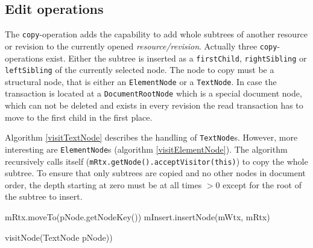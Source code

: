 \subsection{Edit operations}\label{subsec::operations}
The \texttt{copy}-operation adds the capability to add whole subtrees of another resource or revision to the currently opened \emph{resource/revision}. Actually three \texttt{copy}-operations exist. Either the subtree is inserted as a \texttt{first\-Child}, \texttt{rightSibling} or \texttt{leftSibling} of the currently selected node. The node to copy must be a structural node, that is either an \texttt{ElementNode} or a \texttt{TextNode}. In case the transaction is located at a \texttt{DocumentRootNode} which is a special document node, which can not be deleted and exists in every revision the read transaction has to move to the first child in the first place.

Algorithm \ref{visitTextNode} describes the handling of \texttt{TextNode}s. However, more interesting are \texttt{ElementNode}s (algorithm \ref{visitElementNode}). The algorithm recursively calls itself (\texttt{mRtx.getNode().acceptVisitor(this)}) to copy the whole subtree. To ensure that only subtrees are copied and no other nodes in document order, the depth starting at zero must be at all times $>0$ except for the root of the subtree to insert.

\begin{algorithm}[Hhtbp]
\BlankLine
mRtx.moveTo(pNode.getNodeKey())\;
mInsert.insertNode(mWtx, mRtx)\;

\caption{visitNode(TextNode pNode))}\label{visitTextNode}
\end{algorithm}


